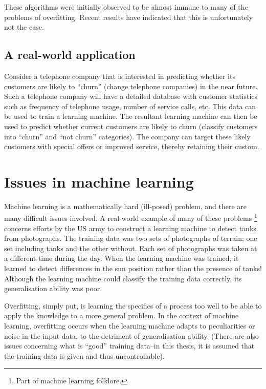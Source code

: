 These algorithms were initially observed to be almost immune to many
of the problems of overfitting.  Recent results have indicated that
this is unfortunately not the case.

\subsection{A real-world application}
\label{sec:churn example}

Consider a telephone company that is interested in predicting whether
its customers are likely to ``churn'' (change telephone companies) in
the near future.  Such a telephone company will have a detailed
database with customer statistics such as frequency of telephone
usage, number of service calls, etc.  This data can be used to train a
learning machine.   The resultant learning machine can then be used to
predict whether current customers are likely to churn (classify
customers into ``churn'' and ``not churn'' categories).  The company
can target these likely customers with special offers or improved
service, thereby retaining their custom.

\section{Issues in machine learning}

Machine learning is a mathematically hard (ill-posed) problem, and
there are many difficult issues involved.  A real-world example of
many of these problems%
\footnote{Part of machine learning folklore.}
concerns efforts by the US army to construct a learning machine to
detect tanks from photographs.  The training data was two sets of
photographs of terrain; one set including tanks and the other without.
Each set of  photographs was taken at a different time during the day.
When the learning machine was trained, it learned to detect
differences in the sun position rather than the presence of tanks!
Although the learning machine could classify the training data
correctly, its generalisation ability was poor.

Overfitting, simply put, is learning the specifics of a process too
well to be able to apply the knowledge to a more general problem.  In
the context of machine learning, overfitting occurs when the learning
machine adapts to peculiarities or noise in the input data, to the
detriment of generalisation ability.  (There are also issues
concerning what is ``good'' training data--in this thesis, it is
assumed that the training data is given and thus uncontrollable).

